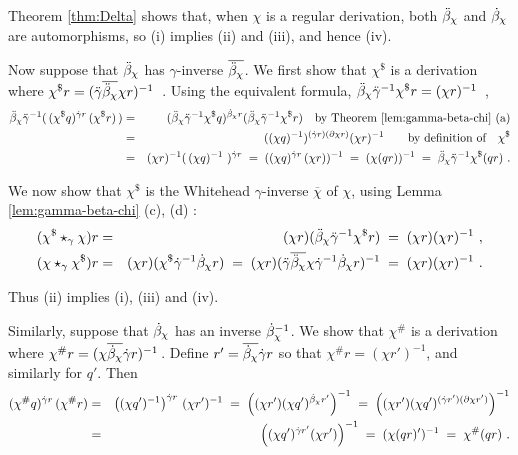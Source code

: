 \begin{pf}
Theorem \ref{thm:Delta} shows that, when $\chi$ is a regular derivation,
both  $\ddot{\beta}_{\chi}$  and  $\dot{\beta}_{\chi}$  are automorphisms, 
so (i) implies (ii) and (iii), and hence (iv).

\medskip
Now suppose that  $\ddot{\beta}_{\chi}$  has $\gamma$-inverse $\overline{\ddot{\beta}_{\chi}}$.
We first show that  $\chi^{\$}$  is a derivation where
$\chi^{\$} r = (\ddot{\gamma} \overline{\ddot{\beta}_{\chi}} \chi r)^{-1}$~.
Using the equivalent formula, 
$\ddot{\beta}_{\chi} \ddot{\gamma}^{-1} \chi^{\$}r = (\chi r)^{-1}$~,
\begin{eqnarray*}
\ddot{\beta}_{\chi} \ddot{\gamma}^{-1}(\,(\chi^{\$} q)^{\dot{\gamma} r} \,(\chi^{\$} r)\,)
  & = &
    (\ddot{\beta}_{\chi} \ddot{\gamma}^{-1} \chi^{\$} q)^{\dot{\beta}_{\chi}r} 
     (\ddot{\beta}_{\chi} \ddot{\gamma}^{-1} \chi^{\$} r)
      \quad \mbox{by Theorem \ref{lem:gamma-beta-chi} (a)} \\
  & = &
    ((\chi q)^{-1})^{(\dot{\gamma} r)(\partial \chi r)} (\chi r)^{-1} 
      \quad\quad \mbox{by definition of} \quad \chi^{\$} \\
  & = &
    (\chi r)^{-1}(\,(\chi q)^{-1}~)^{\dot{\gamma} r} 
  \;=\; 
    ((\chi q)^{\dot{\gamma} r}\,(\chi r))^{-1} 
  \;=\;
    (\chi(qr))^{-1}
  \;=\;
    \ddot{\beta}_{\chi} \ddot{\gamma}^{-1} \chi^{\$}(qr)~.
\end{eqnarray*}

\noindent 
We now show that  $\chi^{\$}$  is the Whitehead $\gamma$-inverse 
$\overline{\chi}$ of  $\chi$, 
using Lemma \ref{lem:gamma-beta-chi} (c), (d) :  
\begin{eqnarray*}
(\chi^{\$} \star_{\gamma} \chi)r 
  & = &  (\chi r)(\ddot{\beta}_{\chi} \ddot{\gamma}^{-1} \chi^{\$} r) 
  \;=\;  (\chi r)(\chi r)^{-1}~, \\ 
(\chi \star_{\gamma} \chi^{\$})r 
  & = &  (\chi r)(\chi^{\$} \dot{\gamma}^{-1} \dot{\beta}_{\chi} r) 
  \;=\;  (\chi r)(\ddot{\gamma} \overline{\ddot{\beta}_{\chi}} \chi \dot{\gamma}^{-1} \dot{\beta}_{\chi} r)^{-1} 
  \;=\;  (\chi r)(\chi r)^{-1}~. 
\end{eqnarray*}

\noindent
Thus (ii) implies (i), (iii) and (iv).

\medskip
Similarly, suppose that  $\dot{\beta}_{\chi}$  has an inverse  $\dot{\beta}_{\chi}^{-1}$.
We show that  $\chi^{\#}$  is a derivation where
$\chi^{\#} r = (\chi \overline{\dot{\beta}_{\chi}} \dot{\gamma} r)^{-1}$\,.
Define  $r' = \overline{\dot{\beta}_{\chi}} \dot{\gamma} r$  so that  
$\chi^{\#}r = (\chi r')^{-1}$, 
and similarly for  $q'$.  Then
\begin{eqnarray*} 
(\chi^{\#}q)^{\dot{\gamma} r}\, (\chi^{\#} r) 
  & = & 
    \left( (\chi q')^{-1} \right)^{\dot{\gamma} r}\, (\chi r')^{-1} 
  \;=\; 
    \left( (\chi r') (\chi q')^{\dot{\beta}_{\chi} r'} \right)^{-1} 
  \;=\; 
    \left( (\chi r') (\chi q')^{(\dot{\gamma} r')(\partial\chi r')} \right)^{-1} \\ 
  & = & 
    \left( (\chi q')^{\dot{\gamma} r'} (\chi r') \right)^{-1}
  \;=\; 
    (\chi(qr)')^{-1}
  \;=\; 
    \chi^{\#}(qr)~. 
\end{eqnarray*}


\end{pf}
